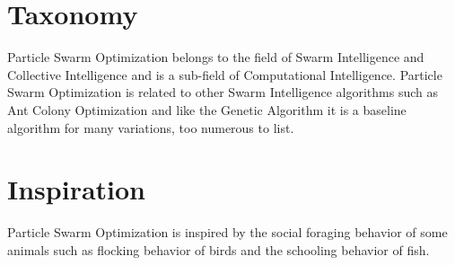 \documentclass[a4paper, 11pt]{article}
\begin{document}
\section{Taxonomy}
\label{sec:taxonomy}
Particle Swarm Optimization belongs to the field of Swarm Intelligence and Collective Intelligence and is a sub-field of Computational Intelligence.
Particle Swarm Optimization is related to other Swarm Intelligence algorithms such as Ant Colony Optimization and like the Genetic Algorithm it is a baseline algorithm for many variations, too numerous to list.

\section{Inspiration}
\label{sec:inspiration}
Particle Swarm Optimization is inspired by the social foraging behavior of some animals such as flocking behavior of birds and the schooling behavior of fish.

\end{document}
